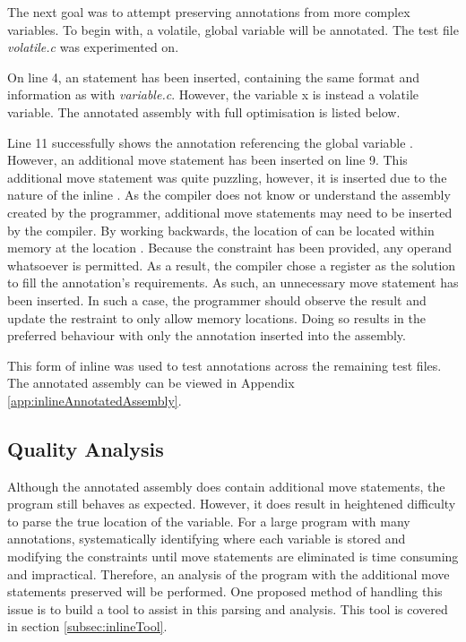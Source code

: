 The next goal was to attempt preserving annotations from more complex variables. To begin with, a volatile, global variable will be annotated. The test file \textit{volatile.c} was experimented on.



On line 4, an  statement has been inserted, containing the same format and information as with \textit{variable.c}. However, the variable x is instead a volatile variable. The annotated assembly with full optimisation is listed below.



Line 11 successfully shows the annotation referencing the global variable . However, an additional move statement has been inserted on line 9. This additional move statement was quite puzzling, however, it is inserted due to the nature of the inline . As the compiler does not know or understand the assembly created by the programmer, additional move statements may need to be inserted by the compiler. By working backwards, the location of  can be located within memory at the location . Because the constraint  has been provided, any operand whatsoever is permitted. As a result, the compiler chose a register as the solution to fill the annotation's requirements. As such, an unnecessary move statement has been inserted. In such a case, the programmer should observe the result and update the  restraint to only allow memory locations. Doing so results in the preferred behaviour with only the annotation inserted into the assembly. 

This form of inline  was used to test annotations across the remaining test files. The annotated assembly can be viewed in Appendix \ref{app:inlineAnnotatedAssembly}.

\subsection{Quality Analysis}

Although the annotated assembly does contain additional move statements, the program still behaves as expected. However, it does result in heightened difficulty to parse the true location of the variable. For a large program with many annotations, systematically identifying where each variable is stored and modifying the constraints until move statements are eliminated is time consuming and impractical. Therefore, an analysis of the program with the additional move statements preserved will be performed. One proposed method of handling this issue is to build a tool to assist in this parsing and analysis. This tool is covered in section \ref{subsec:inlineTool}.

